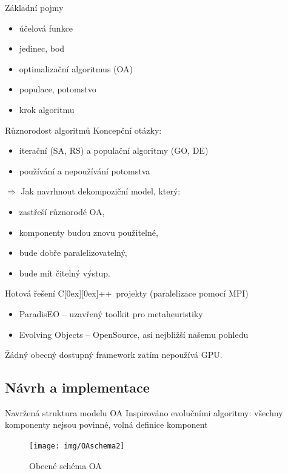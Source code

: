\documentclass[compress,mathserif]{beamer}
\theoremstyle{definition}
\theoremstyle{plain}
\newcommand{\beI}{\begin{itemize}}
\newcommand{\enI}{\end{itemize}}
\newcommand{\Cpp}{C\raisebox{0.15ex}[0ex][0ex]{++}}
\begin{document}
    \begin{frame}{Základní pojmy}
        \beI
            \item účelová funkce
            \item jedinec, bod
            \item optimalizační algoritmus (OA)
            \item populace, potomstvo
            \item krok algoritmu
        \enI
    \end{frame}

    \begin{frame}{Různorodost algoritmů}
        Koncepční otázky:
        \beI
            \item iterační (SA, RS) a populační algoritmy (GO, DE) \\ 
            \item používání a nepoužívání potomstva \\ 
        \enI
         $\Rightarrow$ Jak navrhnout dekompoziční model, který:
          \beI
            \item zastřeší různorodé OA,
            \item komponenty budou znovu použitelné,
            \item bude dobře paralelizovatelný,
            \item bude mít čitelný výstup.
        \enI
    \end{frame}

    \begin{frame}{Hotová řešení}
        \Cpp ~projekty (paralelizace pomocí MPI)
        \beI
            \item ParadisEO -- uzavřený toolkit pro metaheuristiky
            \item Evolving Objects -- OpenSource, asi nejbližší našemu pohledu
        \enI
        \vspace{5mm}
        Žádný obecný dostupný framework zatím nepoužívá GPU.
    \end{frame}

\subsection{Návrh a implementace}
     \begin{frame}{Navržená struktura modelu OA}
        Inspirováno evolučními algoritmy: všechny komponenty nejsou povinné, volná definice komponent
        \begin{figure}[h!]
        \begin{center}
        \texttt{[image: img/OAschema2]}
        \caption{Obecné schéma OA}
        \end{center}
        \end{figure}
     \end{frame}
\end{document}
